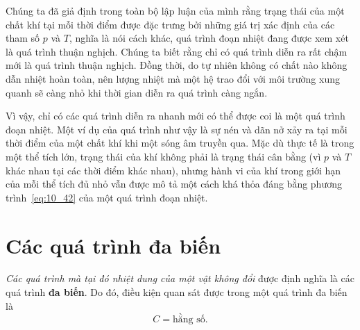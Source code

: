Chúng ta đã giả định trong toàn bộ lập luận của mình rằng trạng thái của một chất khí tại mỗi thời điểm được đặc trưng bởi những giá trị xác định của các tham số $p$ và $T$, nghĩa là nói cách khác, quá trình đoạn nhiệt đang được xem xét là quá trình thuận nghịch. Chúng ta biết rằng chỉ có quá trình diễn ra rất chậm mới là quá trình thuận nghịch. Đồng thời, do tự nhiên không có chất nào không dẫn nhiệt hoàn toàn, nên lượng nhiệt mà một hệ trao đổi với môi trường xung quanh sẽ càng nhỏ khi thời gian diễn ra quá trình càng ngắn.


Vì vậy, chỉ có các quá trình diễn ra nhanh mới có thể được coi là một quá trình đoạn nhiệt. Một ví dụ của quá trình như vậy là sự nén và dãn nở xảy ra tại mỗi thời điểm của một chất khí khi một sóng âm truyền qua. Mặc dù thực tế là trong một thể tích lớn, trạng thái của khí không phải là trạng thái cân bằng (vì $p$ và $T$ khác nhau tại các thời điểm khác nhau), nhưng hành vi của khí trong giới hạn của mỗi thể tích đủ nhỏ vẫn được mô tả một cách khá thỏa đáng bằng phương trình~\eqref{eq:10_42} của một quá trình đoạn nhiệt.


\section{Các quá trình đa biến}\label{sec:10_11}


\textit{Các quá trình mà tại đó nhiệt dung của một vật không đổi} được định nghĩa là các quá trình \textbf{đa biến}. Do đó, điều kiện quan sát được trong một quá trình đa biến là
\begin{equation}\label{eq:10_44}
	C = \text{hằng số}.
\end{equation}


